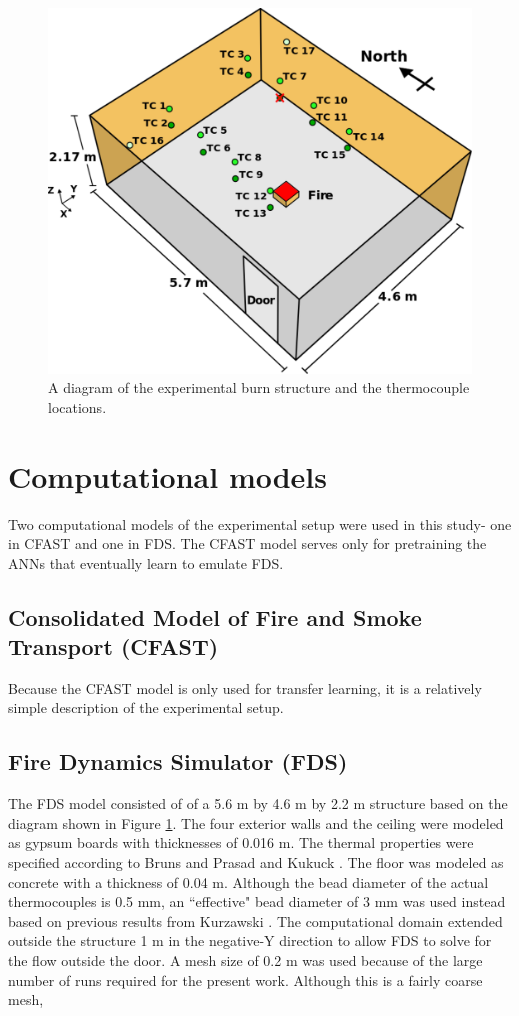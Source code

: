 \documentclass{article}
\begin{document}
\begin{figure}[htb] \centering
\includegraphics[width=.75\textwidth]{figures/Burn_Structure_TC_ML.pdf}
\caption{A diagram of the experimental burn structure and the thermocouple locations.}
\label{fig:tc_locations}
    \end{figure}

\section{Computational models}
Two computational models of the experimental setup were used in this study- one in CFAST and one in FDS. The CFAST model serves only for pretraining the ANNs that eventually learn to emulate FDS. 


\subsection{Consolidated Model of Fire and Smoke Transport (CFAST)}
Because the CFAST model is only used for transfer learning, it is a relatively simple description of the experimental setup. 
\subsection{Fire Dynamics Simulator (FDS)}

The FDS model consisted of of a 5.6 m by 4.6 m by 2.2 m structure based on the diagram shown in Figure \ref{fig:tc_locations}. The four exterior walls and the ceiling were modeled as gypsum boards with thicknesses of 0.016 m. The thermal properties were specified according to Bruns and Prasad \cite{bruns2014parametric} and Kukuck \cite{kukuck2009heat}. The floor was modeled as concrete with a thickness of 0.04 m. Although the bead diameter of the actual thermocouples is 0.5 mm, an ``effective" bead diameter of 3 mm was used instead based on previous results from Kurzawski \cite{kurzawski2017inversion}. The computational domain extended outside the structure 1 m in the negative-Y direction to allow FDS to solve for the flow outside the door. A mesh size of 0.2 m was used because of the large number of runs required for the present work. Although this is a fairly coarse mesh, 
\end{document}
